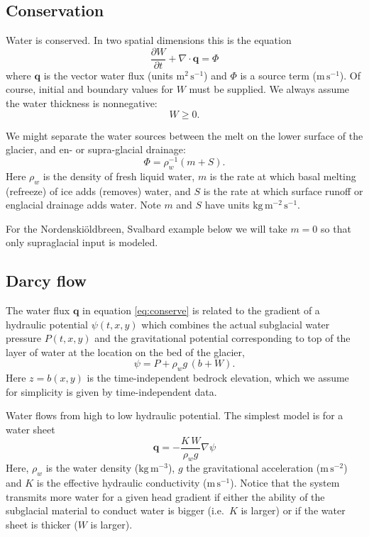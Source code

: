 \documentclass[11pt,final]{amsart}%
\newcommand\bq{\mathbf{q}}
\newcommand{\Div}{\nabla\cdot}
\newcommand{\grad}{\nabla}
\begin{document}
\subsection*{Conservation}  Water is conserved.  In two spatial dimensions this is the equation \citep{Clarke05}
\begin{equation} \label{eq:conserve}
\frac{\partial W}{\partial t} + \Div \bq = \Phi
\end{equation}
where $\bq$ is the vector water flux (units $\text{m}^2\,\text{s}^{-1}$) and $\Phi$ is a source term ($\text{m}\,\text{s}^{-1}$).  Of course, initial and boundary values for $W$ must be supplied.  We always assume the water thickness is nonnegative:
\begin{equation}
W \ge 0.
\end{equation}

We might separate the water sources between the melt on the lower surface of the glacier, and en- or supra-glacial drainage:
  $$\Phi = \rho_w^{-1} \left(m + S\right).$$
Here $\rho_w$ is the density of fresh liquid water, $m$ is the rate at which basal melting (refreeze) of ice adds (removes) water, and $S$ is the rate at which surface runoff or englacial drainage adds water.  Note $m$ and $S$ have units $\text{kg}\,\text{m}^{-2}\,\text{s}^{-1}$.

\newcommand{\Nbreen}{Nordenski\"oldbreen\xspace}
For the \Nbreen, Svalbard example below we will take $m=0$ so that only supraglacial input is modeled.

\subsection*{Darcy flow}  The water flux $\bq$ in equation \eqref{eq:conserve} is related to the gradient of a hydraulic potential $\psi(t,x,y)$ which combines the actual subglacial water pressure $P(t,x,y)$ and the gravitational potential corresponding to top of the layer of water at the location on the bed of the glacier,
\begin{equation} \label{eq:potential}
\psi = P + \rho_w g\, (b+W).
\end{equation}
Here $z=b(x,y)$ is the time-independent bedrock elevation, which we assume for simplicity is given by time-independent data.

Water flows from high to low hydraulic potential.  The simplest model is for a water sheet \citep{Clarke05}
\begin{equation}  \label{eq:flux}
\bq = - \frac{K \, W}{\rho_w g} \grad \psi
\end{equation}
Here, $\rho_w$ is the water density ($\text{kg}\,\text{m}^{-3}$), $g$ the gravitational acceleration ($\text{m}\,\text{s}^{-2}$) and $K$ is the effective hydraulic conductivity ($\text{m}\,\text{s}^{-1}$).  Notice that the system transmits more water for a given head gradient if either the ability of the subglacial material to conduct water is bigger (i.e.~$K$ is larger) or if the water sheet is thicker ($W$ is larger).
\end{document}
